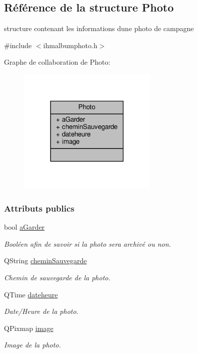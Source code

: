 \hypertarget{struct_photo}{}\subsection{Référence de la structure Photo}
\label{struct_photo}


structure contenant les informations d\textquotesingle{}une photo de campagne  




{\ttfamily \#include $<$ihmalbumphoto.\+h$>$}



Graphe de collaboration de Photo\+:\nopagebreak
\begin{figure}[H]
\begin{center}
\leavevmode
\includegraphics[width=189pt]{struct_photo__coll__graph}
\end{center}
\end{figure}
\subsubsection*{Attributs publics}
\begin{DoxyCompactItemize}
\item 
bool \hyperlink{struct_photo_afec1baefdd7d036432494bbb33b21366}{a\+Garder}
\begin{DoxyCompactList}\small\item\em Booléen afin de savoir si la photo sera archivé ou non. \end{DoxyCompactList}\item 
Q\+String \hyperlink{struct_photo_a3c28eb9ad160b65deb46a72146a1d14f}{chemin\+Sauvegarde}
\begin{DoxyCompactList}\small\item\em Chemin de sauvegarde de la photo. \end{DoxyCompactList}\item 
Q\+Time \hyperlink{struct_photo_a0ac4d5bba2d119ca73ba949d18a557bd}{dateheure}
\begin{DoxyCompactList}\small\item\em Date/\+Heure de la photo. \end{DoxyCompactList}\item 
Q\+Pixmap \hyperlink{struct_photo_aa6ecfed8082bea5af2905208308a6adb}{image}
\begin{DoxyCompactList}\small\item\em Image de la photo. \end{DoxyCompactList}\end{DoxyCompactItemize}


